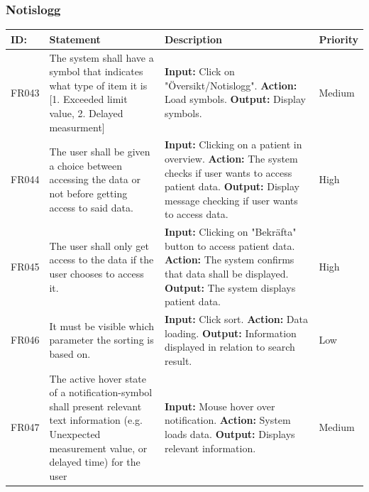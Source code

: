 \documentclass{scrreprt}
\begin{document}
\subsubsection{Notislogg}
\begin{center}
\begin{tabularx}{\linewidth}{| l | X | X | l |}
\hline
\textbf{ID:} & \textbf{Statement} & \textbf{Description} & \textbf{Priority} \\ 
\hline
FR043 & The system shall have a symbol that indicates what type of item it is [1. Exceeded limit value, 2. Delayed measurment] & \textbf{Input:} Click on "Översikt/Notislogg".
\newline \textbf{Action:} Load symbols.
\newline \textbf{Output:} Display symbols. & Medium \\
\hline
FR044 & The user shall be given a choice between accessing the data or not before getting access to said data. & \textbf{Input:} Clicking on a patient in overview.
\newline \textbf{Action:} The system checks if user wants to access patient data.
\newline \textbf{Output:} Display message checking if user wants to access data. & High \\
\hline
FR045 & The user shall only get access to the data if the user chooses to access it. & \textbf{Input:} Clicking on "Bekräfta" button to access patient data.
\newline \textbf{Action:} The system confirms that data shall be displayed.
\newline \textbf{Output:} The system displays patient data. & High \\ 
\hline
FR046 & It must be visible which parameter the sorting is based on. & \textbf{Input:} Click sort.
\newline \textbf{Action:} Data loading.
\newline \textbf{Output:} Information displayed in relation to search result. & Low \\ 
\hline
FR047 & The active hover state of a notification-symbol shall present relevant text information (e.g. Unexpected measurement value, or delayed time) for the user   & \textbf{Input:} Mouse hover over notification.
\newline \textbf{Action:} System loads data.
\newline \textbf{Output:} Displays relevant information. & Medium \\ 
\hline
\end{tabularx}

\end{center}
\end{document}
